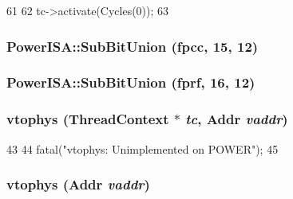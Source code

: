 \begin{DoxyCode}
61 {
62     tc->activate(Cycles(0));
63 }
\end{DoxyCode}
\hypertarget{namespacePowerISA_ab41ae2df93e0b6619beec050ee522e8d}{
\subsubsection[{SubBitUnion}]{\setlength{\rightskip}{0pt plus 5cm}PowerISA::SubBitUnion (fpcc, \/  15, \/  12)}}
\label{namespacePowerISA_ab41ae2df93e0b6619beec050ee522e8d}
\hypertarget{namespacePowerISA_a8751f506ec057d848f6276c80b7c5f78}{
\subsubsection[{SubBitUnion}]{\setlength{\rightskip}{0pt plus 5cm}PowerISA::SubBitUnion (fprf, \/  16, \/  12)}}
\label{namespacePowerISA_a8751f506ec057d848f6276c80b7c5f78}
\hypertarget{namespacePowerISA_ad4bbbca3210dee66152520984c3aac6a}{
\subsubsection[{vtophys}]{ vtophys ({\bf ThreadContext} $\ast$ {\em tc}, \/  {\bf Addr} {\em vaddr})}}
\label{namespacePowerISA_ad4bbbca3210dee66152520984c3aac6a}



\begin{DoxyCode}
43 {
44     fatal("vtophys: Unimplemented on POWER\n");
45 }
\end{DoxyCode}
\hypertarget{namespacePowerISA_a3828815371ad2b0a1be60abdcb405cf9}{
\subsubsection[{vtophys}]{ vtophys ({\bf Addr} {\em vaddr})}}
\label{namespacePowerISA_a3828815371ad2b0a1be60abdcb405cf9}



